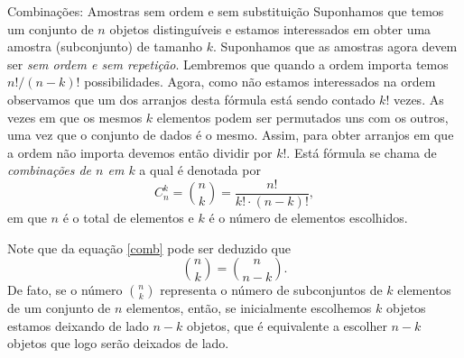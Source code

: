 \begin{frame}{Combinações: Amostras sem ordem e sem substituição} Suponhamos  que temos um conjunto de $n$ objetos distinguíveis e estamos interessados em obter uma amostra (subconjunto)  de tamanho $k.$ Suponhamos que as amostras agora devem ser {\it sem ordem e sem repetição}.  Lembremos que quando a ordem importa temos ${n!}/{(n-k)!}$ possibilidades. Agora, como não estamos interessados na ordem observamos que um dos arranjos desta fórmula está sendo contado $k!$ vezes. As vezes em que os mesmos $k$ elementos podem ser permutados uns com os outros, uma vez que o conjunto de dados é o mesmo. Assim, para obter arranjos em que a ordem não importa devemos então dividir por $k!.$ Está fórmula se chama de {\it combinações de $n$ em $k$} a qual é denotada por 
\begin{equation}
\label{comb}
C_n^k = {n\choose k} = \frac{n!}{k!\cdot\left(n - k\right)!}, 
\end{equation}
em que  $n$ é o total de elementos e $k$ é o número de elementos escolhidos. 

Note que da equação \ref{comb} pode ser deduzido que 
\begin{equation}
\label{comb2}
{n \choose k} = {n \choose n-k} .
\end{equation}
De fato, se o número $\displaystyle{{n \choose k}}$ representa o número de subconjuntos de $k$ elementos
de um conjunto de $n$ elementos, então, se inicialmente escolhemos $k$ objetos estamos deixando de lado $n-k$ objetos, que é equivalente a escolher $n-k$ objetos que logo serão deixados de lado.

\end{frame}

